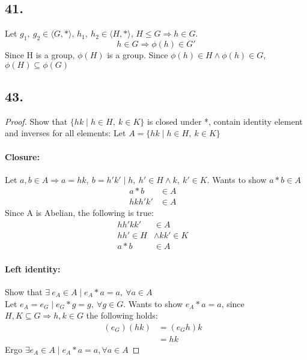 \documentclass{article}
\begin{document}
\subsection*{41. }
Let $g_1,\ g_2 \in \langle G, *\rangle$, $h_1,\ h_2 \in \langle H, *\rangle$,
$H\le G \Rightarrow h \in G$.
$$h \in G \Rightarrow \phi (h) \in G'$$
Since H is a group, $\phi(H)$ is a group. Since $\phi(h) \in H \wedge \phi(h)
\in G$, $\phi(H) \subseteq \phi(G)$

\subsection*{43. }
\begin{proof} Show that $\{hk\mid h\in H,\ k\in K\}$ is closed under *,
	contain identity element and inverses for all elements:
	Let $A = \{hk\mid h\in H,\ k\in K\}$

	\paragraph{Closure: }Let $a,b \in A \Rightarrow a=hk,\ b=h'k'\mid h,\ h'\in
	H \wedge k,\ k'\in K$. Wants to show $a*b \in A$
	\begin{align*}
		a*b &\in A&\\
		hkh'k' &\in A&
	\end{align*}
	Since A is Abelian, the following is true:
	\begin{align*}
		hh'kk' &\in A&\\
		hh' \in H &\wedge kk' \in K&\\
		a*b &\in A&
	\end{align*}

	\paragraph{Left identity: }Show that $\exists\ e_A \in A 
		\mid e_A*a = a,\ \forall a \in A$ \\
		Let $e_A = e_G \mid e_G * g = g,\ \forall g \in G$. 
		Wants to show $e_A * a = a$, since $H, K \subseteq G \Rightarrow h, k \in G$
		the following holds:
		\begin{align*}
			(e_G)(hk) &= (e_Gh)k&\\
							 &= hk&
		\end{align*}
		Ergo $\exists e_A \in A \mid e_A*a=a, \forall a \in A$


\end{proof}
\end{document}
